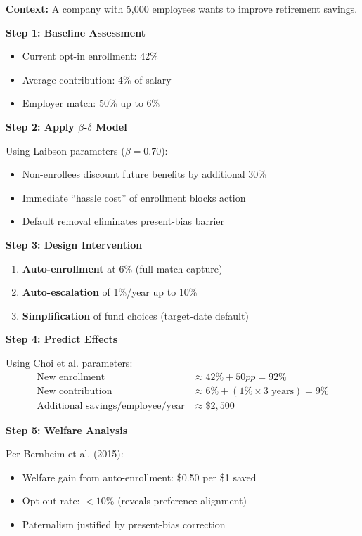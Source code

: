 \begin{tcolorbox}[colback=blue!5!white,colframe=blue!75!black,title=Application: Auto-Enrollment Program Design]
\textbf{Context:} A company with 5,000 employees wants to improve retirement savings.

\textbf{Step 1: Baseline Assessment}
\begin{itemize}
    \item Current opt-in enrollment: 42\%
    \item Average contribution: 4\% of salary
    \item Employer match: 50\% up to 6\%
\end{itemize}

\textbf{Step 2: Apply $\beta$-$\delta$ Model}

Using Laibson parameters ($\beta = 0.70$):
\begin{itemize}
    \item Non-enrollees discount future benefits by additional 30\%
    \item Immediate ``hassle cost'' of enrollment blocks action
    \item Default removal eliminates present-bias barrier
\end{itemize}

\textbf{Step 3: Design Intervention}

\begin{enumerate}
    \item \textbf{Auto-enrollment} at 6\% (full match capture)
    \item \textbf{Auto-escalation} of 1\%/year up to 10\%
    \item \textbf{Simplification} of fund choices (target-date default)
\end{enumerate}

\textbf{Step 4: Predict Effects}

Using Choi et al. parameters:
\begin{align}
\text{New enrollment} &\approx 42\% + 50pp = 92\% \\
\text{New contribution} &\approx 6\% + (1\% \times 3 \text{ years}) = 9\% \\
\text{Additional savings/employee/year} &\approx \$2,500
\end{align}

\textbf{Step 5: Welfare Analysis}

Per Bernheim et al. (2015):
\begin{itemize}
    \item Welfare gain from auto-enrollment: \$0.50 per \$1 saved
    \item Opt-out rate: $<10\%$ (reveals preference alignment)
    \item Paternalism justified by present-bias correction
\end{itemize}
\end{tcolorbox}


